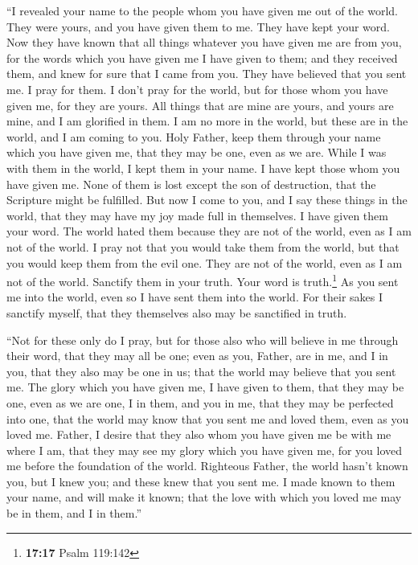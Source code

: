  ``I revealed your name to the people whom you have given
me out of the world. They were yours, and you have given them to me.
They have kept your word.  Now they have known that all
things whatever you have given me are from you,  for the
words which you have given me I have given to them; and they received
them, and knew for sure that I came from you. They have believed that
you sent me.  I pray for them. I don't pray for the world,
but for those whom you have given me, for they are yours.
 All things that are mine are yours, and yours are mine,
and I am glorified in them.  I am no more in the world,
but these are in the world, and I am coming to you. Holy Father, keep
them through your name which you have given me, that they may be one,
even as we are.  While I was with them in the world, I
kept them in your name. I have kept those whom you have given me. None
of them is lost except the son of destruction, that the Scripture might
be fulfilled.  But now I come to you, and I say these
things in the world, that they may have my joy made full in themselves.
 I have given them your word. The world hated them
because they are not of the world, even as I am not of the world.
 I pray not that you would take them from the world, but
that you would keep them from the evil one.  They are not
of the world, even as I am not of the world.  Sanctify
them in your truth. Your word is truth.\footnote{\textbf{17:17} Psalm
  119:142}  As you sent me into the world, even so I have
sent them into the world.  For their sakes I sanctify
myself, that they themselves also may be sanctified in truth.

 ``Not for these only do I pray, but for those also who
will believe in me through their word,  that they may all
be one; even as you, Father, are in me, and I in you, that they also may
be one in us; that the world may believe that you sent me.
 The glory which you have given me, I have given to them,
that they may be one, even as we are one,  I in them, and
you in me, that they may be perfected into one, that the world may know
that you sent me and loved them, even as you loved me. 
Father, I desire that they also whom you have given me be with me where
I am, that they may see my glory which you have given me, for you loved
me before the foundation of the world.  Righteous Father,
the world hasn't known you, but I knew you; and these knew that you sent
me.  I made known to them your name, and will make it
known; that the love with which you loved me may be in them, and I in
them.''

